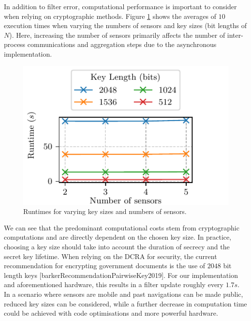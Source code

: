In addition to filter error, computational performance is important to consider when relying on cryptographic methods. Figure \ref{fig:sim_timing} shows the averages of $10$ execution times when varying the numbers of sensors and key sizes (bit lengths of $N$). Here, increasing the number of sensors primarily affects the number of inter-process communications and aggregation steps due to the asynchronous implementation.
\begin{figure}[htbp]
    \centering
    \includegraphics{figures/timing.pdf}
    \caption{Runtimes for varying key sizes and numbers of sensors.}
    \label{fig:sim_timing}
\end{figure}
We can see that the predominant computational costs stem from cryptographic computations and are directly dependent on the chosen key size. In practice, choosing a key size should take into account the duration of secrecy and the secret key lifetime. When relying on the DCRA for security, the current recommendation for encrypting government documents is the use of $2048$ bit length keys [barkerRecommendationPairwiseKey2019]. For our implementation and aforementioned hardware, this results in a filter update roughly every $1.7s$. In a scenario where sensors are mobile and past navigations can be made public, reduced key sizes can be considered, while a further decrease in computation time could be achieved with code optimisations and more powerful hardware.

% 
%                                               
%                                               
%                                               
% 

